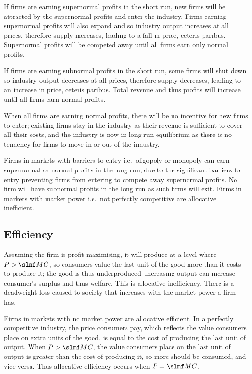 \documentclass[Economics.tex]{subfiles}
\begin{document}
If firms are earning supernormal profits in the short run, new firms will be attracted by the supernormal profits and enter the industry. Firms earning supernormal profits will also expand and so industry output increases at all prices, therefore supply increases, leading to a fall in price, ceteris paribus. Supernormal profits will be competed away until all firms earn only normal profits.

If firms are earning subnormal profits in the short run, some firms will shut down so industry output decreases at all prices, therefore supply decreases, leading to an increase in price, ceteris paribus. Total revenue and thus profits will increase until all firms earn normal profits.

When all firms are earning normal profits, there will be no incentive for new firms to enter; existing firms stay in the industry as their revenue is sufficient to cover all their costs, and the industry is now in long run equilibrium as there is no tendency for firms to move in or out of the industry.

Firms in markets with barriers to entry i.e.\ oligopoly or monopoly can earn supernormal or normal profits in the long run, due to the significant barriers to entry preventing firms from entering to compete away supernormal profits. No firm will have subnormal profits in the long run as such firms will exit.
Firms in markets with market power i.e.\ not perfectly competitive are allocative inefficient.
\subsection{Efficiency}
Assuming the firm is profit maximising, it will produce at a level where \(P > \mrg{C}\), so consumers value the last unit of the good more than it costs to produce it; the good is thus underproduced: increasing output can increase consumer's surplus and thus welfare. This is allocative inefficiency. There is a deadweight loss caused to society that increases with the market power a firm has.

Firms in markets with no market power are allocative efficient. In a perfectly competitive industry, the price consumers pay, which reflects the value consumers place on extra units of the good, is equal to the cost of producing the last unit of output. When \(P > \mrg{C}\), the value consumers place on the last unit of output is greater than the cost of producing it, so more should be consumed, and vice versa. Thus allocative efficiency occurs when \(P = \mrg{C}\).
\end{document}
